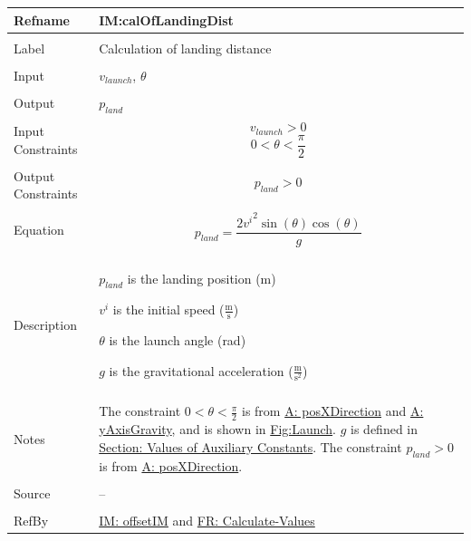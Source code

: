 \documentclass[12pt]{article}
\begin{document}
\noindent \begin{minipage}{\textwidth}
\begin{tabular}{p{} p{}}
\toprule \textbf{Refname} & \textbf{IM:calOfLandingDist}
\label{IM:calOfLandingDist}
\\ \midrule \\
Label & Calculation of landing distance
\\ \midrule \\
Input & ${v_{launch}}$, $θ$
\\ \midrule \\
Output & ${p_{land}}$
\\ \midrule \\
Input Constraints & \begin{displaymath}
                    {v_{launch}}>0
                    \end{displaymath}
                    \begin{displaymath}
                    0<θ<\frac{π}{2}
                    \end{displaymath}
\\ \midrule \\
Output Constraints & \begin{displaymath}
                     {p_{land}}>0
                     \end{displaymath}
\\ \midrule \\
Equation & \begin{displaymath}
           {p_{land}}=\frac{2 {v^{i}}^{2} \sin\left(θ\right) \cos\left(θ\right)}{g}
           \end{displaymath}
\\ \midrule \\
Description & \begin{symbDescription}
              \item{${p_{land}}$ is the landing position (m)}
              \item{${v^{i}}$ is the initial speed ($\frac{\text{m}}{\text{s}}$)}
              \item{$θ$ is the launch angle (rad)}
              \item{$g$ is the gravitational acceleration ($\frac{\text{m}}{\text{s}^{2}}$)}
              \end{symbDescription}
\\ \midrule \\
Notes & The constraint $0<θ<\frac{π}{2}$ is from \hyperref[posXDirection]{A: posXDirection} and \hyperref[yAxisGravity]{A: yAxisGravity}, and is shown in \hyperref[Figure:Launch]{Fig:Launch}.
        $g$ is defined in \hyperref[Sec:AuxConstants]{Section: Values of Auxiliary Constants}.
        The constraint ${p_{land}}>0$ is from \hyperref[posXDirection]{A: posXDirection}.
\\ \midrule \\
Source & --
\\ \midrule \\
RefBy & \hyperref[IM:offsetIM]{IM: offsetIM} and \hyperref[calcValues]{FR: Calculate-Values}
\\ \bottomrule \end{tabular}
\end{minipage}
\end{document}
